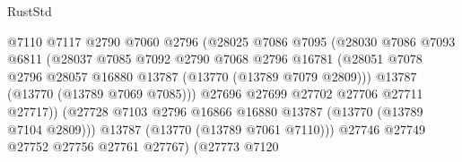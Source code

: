 \begin{lexlean}{RustStd}
\begin{coremodule}
                                        @7110
                                        @7117
                                        @2790
                                        @7060
                                        @2796
                                        (@28025
                                          @7086
                                          @7095
                                          (@28030
                                            @7086
                                            @7093
                                            @6811
                                            (@28037
                                              @7085
                                              @7092
                                              @2790
                                              @7068
                                              @2796
                                              @16781
                                              (@28051
                                                @7078
                                                @2796
                                                @28057
                                                @16880
                                                @13787
                                                (@13770 (@13789 @7079 @2809)))
                                              @13787
                                              (@13770 (@13789 @7069 @7085)))
                                            @27696
                                            @27699
                                            @27702
                                            @27706
                                            @27711
                                            @27717))
                                        (@27728
                                          @7103
                                          @2796
                                          @16866
                                          @16880
                                          @13787
                                          (@13770 (@13789 @7104 @2809)))
                                        @13787
                                        (@13770 (@13789 @7061 @7110)))
                                      @27746
                                      @27749
                                      @27752
                                      @27756
                                      @27761
                                      @27767)
                                    (@27773
                                      @7120

\end{coremodule}
\end{lexlean}

